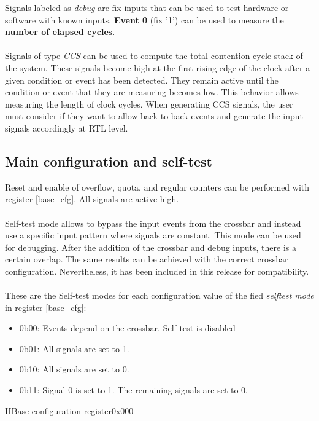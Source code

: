 Signals labeled as \textit{debug} are fix inputs that can be used to test hardware or software with known inputs. \textbf{Event 0} (fix '1') can be used to measure the \textbf{number of elapsed cycles}.\\
\\
Signals of type \textit{CCS} can be used to compute the total contention cycle stack of the system. These signals become high at the first rising edge of the clock after a given condition or event has been detected. They remain active until the condition or event that they are measuring becomes low. This behavior allows measuring the length of clock cycles. When generating CCS signals, the user must consider if they want to allow back to back events and generate the input signals accordingly at RTL level.

\subsection{Main configuration and self-test}
Reset and enable of overflow, quota, and regular counters can be performed with register \ref{base_cfg}. All signals are active high.\\
\\
Self-test mode allows to bypass the input events from the crossbar and instead use a specific input pattern where signals are constant. This mode can be used for debugging. After the addition of the crossbar and debug inputs, there is a certain overlap. The same results can be achieved with the correct crossbar configuration. Nevertheless, it has been included in this release for compatibility.\\
\\
These are the Self-test modes for each configuration value of the fied \textit{selftest mode} in register \ref{base_cfg}:
\begin{itemize}
	\item 0b00: Events depend on the crossbar. Self-test is disabled
	\item 0b01: All signals are set to 1.
	\item 0b10: All signals are set to 0.
	\item 0b11: Signal 0 is set to 1.  The remaining signals are set to 0.
\end{itemize}

 \begin{register}{H}{Base configuration register}{0x000}
   \label{base_cfg}
   \regnewline
  \end{register}

